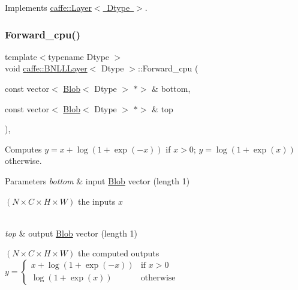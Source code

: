 Implements \mbox{\hyperlink{classcaffe_1_1_layer_a75c9b2a321dc713e0eaef530d02dc37f}{caffe\+::\+Layer$<$ Dtype $>$}}.

\mbox{\label{classcaffe_1_1_b_n_l_l_layer_ad85abcd4d6afd609be859f0360525102}} 
\subsubsection{\texorpdfstring{Forward\+\_\+cpu()}{Forward\_cpu()}\hspace{0.1cm}{\footnotesize\ttfamily [1/2]}}
{\footnotesize\ttfamily template$<$typename Dtype $>$ \\
void \mbox{\hyperlink{classcaffe_1_1_b_n_l_l_layer}{caffe\+::\+B\+N\+L\+L\+Layer}}$<$ Dtype $>$\+::Forward\+\_\+cpu (\begin{DoxyParamCaption}\item[{const vector$<$ \mbox{\hyperlink{classcaffe_1_1_blob}{Blob}}$<$ Dtype $>$ $\ast$$>$ \&}]{bottom,  }\item[{const vector$<$ \mbox{\hyperlink{classcaffe_1_1_blob}{Blob}}$<$ Dtype $>$ $\ast$$>$ \&}]{top }\end{DoxyParamCaption})\hspace{0.3cm}{\ttfamily [protected]}, {\ttfamily [virtual]}}



Computes $ y = x + \log(1 + \exp(-x)) $ if $ x > 0 $; $ y = \log(1 + \exp(x)) $ otherwise. 


\begin{DoxyParams}{Parameters}
{\em bottom} & input \mbox{\hyperlink{classcaffe_1_1_blob}{Blob}} vector (length 1)
\begin{DoxyEnumerate}
\item $ (N \times C \times H \times W) $ the inputs $ x $ 
\end{DoxyEnumerate}\\
\hline
{\em top} & output \mbox{\hyperlink{classcaffe_1_1_blob}{Blob}} vector (length 1)
\begin{DoxyEnumerate}
\item $ (N \times C \times H \times W) $ the computed outputs $ y = \left\{ \begin{array}{ll} x + \log(1 + \exp(-x)) & \mbox{if } x > 0 \\ \log(1 + \exp(x)) & \mbox{otherwise} \end{array} \right. $ 
\end{DoxyEnumerate}\\
\hline
\end{DoxyParams}


